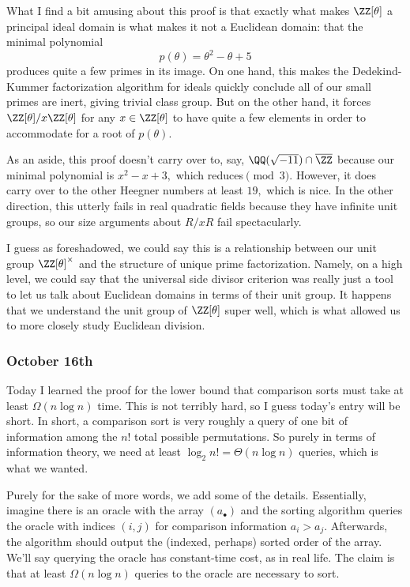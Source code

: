 What I find a bit amusing about this proof is that exactly what makes $\ZZ[\theta]$ a principal ideal domain is what makes it not a Euclidean domain: that the minimal polynomial 
\[p(\theta)=\theta^2-\theta+5\]
produces quite a few primes in its image. On one hand, this makes the Dedekind-Kummer factorization algorithm for ideals quickly conclude all of our small primes are inert, giving trivial class group. But on the other hand, it forces $\ZZ[\theta]/x\ZZ[\theta]$ for any $x\in\ZZ[\theta]$ to have quite a few elements in order to accommodate for a root of $p(\theta).$

As an aside, this proof doesn't carry over to, say, $\QQ(\sqrt{-11})\cap\overline\ZZ$ because our minimal polynomial is $x^2-x+3,$ which reduces$\pmod3.$ However, it does carry over to the other Heegner numbers at least $19,$ which is nice. In the other direction, this utterly fails in real quadratic fields because they have infinite unit groups, so our size arguments about $R/xR$ fail spectacularly.

I guess as foreshadowed, we could say this is a relationship between our unit group $\ZZ[\theta]^\times$ and the structure of unique prime factorization. Namely, on a high level, we could say that the universal side divisor criterion was really just a tool to let us talk about Euclidean domains in terms of their unit group. It happens that we understand the unit group of $\ZZ[\theta]$ super well, which is what allowed us to more closely study Euclidean division.

\subsubsection{October 16th}
Today I learned the proof for the lower bound that comparison sorts must take at least $\Omega(n\log n)$ time. This is not terribly hard, so I guess today's entry will be short. In short, a comparison sort is very roughly a query of one bit of information among the $n!$ total possible permutations. So purely in terms of information theory, we need at least $\log_2n!=\Theta(n\log n)$ queries, which is what we wanted.

Purely for the sake of more words, we add some of the details. Essentially, imagine there is an oracle with the array $(a_\bullet)$ and the sorting algorithm queries the oracle with indices $(i,j)$ for comparison information $a_i>a_j.$ Afterwards, the algorithm should output the (indexed, perhaps) sorted order of the array. We'll say querying the oracle has constant-time cost, as in real life. The claim is that at least $\Omega(n\log n)$ queries to the oracle are necessary to sort.

